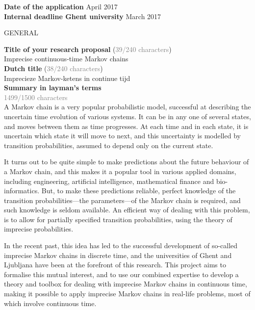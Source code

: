 \documentclass[11pt,dvipsnames,usenames,a4paper]{article}
\begin{document}
\newcommand{\todo}[1]{\textcolor{red}{\emph{#1}}}


{\bf Date of the application} \tab{} April 2017 \\
{\bf Internal deadline Ghent university}  March 2017 \\


\begin{shaded}\centering GENERAL \end{shaded}
\textbf{Title of your research proposal} (\textcolor{Gray}{39/240 characters})\\
Imprecise continuous-time Markov chains\\[8pt]
\textbf{Dutch title} (\textcolor{Gray}{38/240 characters})\\
Imprecieze Markov-ketens in continue tijd\\[8pt]
\textbf{Summary in layman's terms}\\
\textcolor{Gray}{1499/1500 characters}\\
A Markov chain is a very popular probabilistic model, successful at describing the uncertain time evolution of various systems. 
It can be in any one of several states, and moves between them as time progresses. 
At each time and in each state, it is uncertain which state it will move to next, and this uncertainty is modelled by transition probabilities, assumed to depend only on the current state. 

It turns out to be quite simple to make predictions about the future behaviour of a Markov chain, and this makes it a popular tool in various applied domains, including engineering, artificial intelligence, mathematical finance and bio-informatics. 
But, to make these predictions reliable, perfect knowledge of the transition probabilities---the parameters---of the Markov chain is required, and such knowledge is seldom available. 
An efficient way of dealing with this problem, is to allow for partially specified transition probabilities, using the theory of imprecise probabilities.

In the recent past, this idea has led to the successful development of so-called imprecise Markov chains in discrete time, and the universities of Ghent and Ljubljana have been at the forefront of this research. 
This project aims to formalise this mutual interest, and to use our combined expertise to develop a theory and toolbox for dealing with imprecise Markov chains in continuous time, making it possible to apply imprecise Markov chains in real-life problems, most of which involve continuous time.
\end{document}
